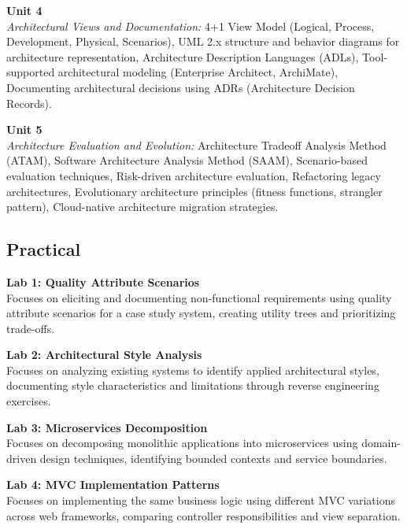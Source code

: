 \noindent\textbf{Unit 4} \\
\textit{Architectural Views and Documentation:} 4+1 View Model (Logical, Process, Development, Physical, Scenarios), UML 2.x structure and behavior diagrams for architecture representation, Architecture Description Languages (ADLs), Tool-supported architectural modeling (Enterprise Architect, ArchiMate), Documenting architectural decisions using ADRs (Architecture Decision Records).

\vspace{0.3cm}

\noindent\textbf{Unit 5} \\
\textit{Architecture Evaluation and Evolution:} Architecture Tradeoff Analysis Method (ATAM), Software Architecture Analysis Method (SAAM), Scenario-based evaluation techniques, Risk-driven architecture evaluation, Refactoring legacy architectures, Evolutionary architecture principles (fitness functions, strangler pattern), Cloud-native architecture migration strategies.

\newpage

\subsection*{Practical}
\noindent\textbf{Lab 1: Quality Attribute Scenarios} \\
Focuses on eliciting and documenting non-functional requirements using quality attribute scenarios for a case study system, creating utility trees and prioritizing trade-offs.

\vspace{0.2cm}

\noindent\textbf{Lab 2: Architectural Style Analysis} \\
Focuses on analyzing existing systems to identify applied architectural styles, documenting style characteristics and limitations through reverse engineering exercises.

\vspace{0.2cm}

\noindent\textbf{Lab 3: Microservices Decomposition} \\
Focuses on decomposing monolithic applications into microservices using domain-driven design techniques, identifying bounded contexts and service boundaries.

\vspace{0.2cm}

\noindent\textbf{Lab 4: MVC Implementation Patterns} \\
Focuses on implementing the same business logic using different MVC variations across web frameworks, comparing controller responsibilities and view separation.

